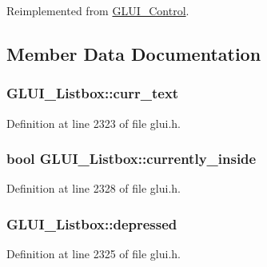 Reimplemented from \hyperlink{class_g_l_u_i___control_a4bfe55acbbf735a7d2ff07d687a481e2}{G\+L\+U\+I\+\_\+\+Control}.



\subsection{Member Data Documentation}
\hypertarget{class_g_l_u_i___listbox_a914b9f8f231fe92b507ec64fbe209271}{
\subsubsection[{curr\+\_\+text}]{ G\+L\+U\+I\+\_\+\+Listbox\+::curr\+\_\+text}}\label{class_g_l_u_i___listbox_a914b9f8f231fe92b507ec64fbe209271}


Definition at line 2323 of file glui.\+h.

\hypertarget{class_g_l_u_i___listbox_a5710debcc1604913c926f65db2019b56}{
\subsubsection[{currently\+\_\+inside}]{\setlength{\rightskip}{0pt plus 5cm}bool G\+L\+U\+I\+\_\+\+Listbox\+::currently\+\_\+inside}}\label{class_g_l_u_i___listbox_a5710debcc1604913c926f65db2019b56}


Definition at line 2328 of file glui.\+h.

\hypertarget{class_g_l_u_i___listbox_a1e00ed51f0b6c8d7e82e8974889a40e7}{
\subsubsection[{depressed}]{ G\+L\+U\+I\+\_\+\+Listbox\+::depressed}}\label{class_g_l_u_i___listbox_a1e00ed51f0b6c8d7e82e8974889a40e7}


Definition at line 2325 of file glui.\+h.

